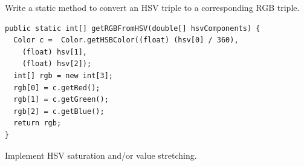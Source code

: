 \documentclass{book}
\begin{document}
\begin{exercise}
Write a static method  to convert an HSV triple to a corresponding RGB triple.
\begin{lstlisting}
public static int[] getRGBFromHSV(double[] hsvComponents) {
  Color c =  Color.getHSBColor((float) (hsv[0] / 360), 
    (float) hsv[1], 
    (float) hsv[2]);
  int[] rgb = new int[3];
  rgb[0] = c.getRed();
  rgb[1] = c.getGreen();
  rgb[2] = c.getBlue();
  return rgb;
}
\end{lstlisting}
\end{exercise}

\begin{exercise}
Implement HSV saturation and/or value stretching.
\end{exercise}


\end{document}
